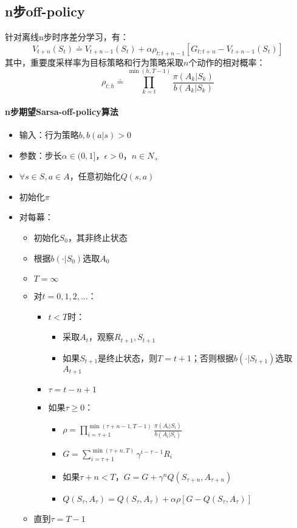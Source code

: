 \documentclass[
12pt, %
a4paper, 
oneside, %
headinclude,footinclude, %
]{scrartcl}
\begin{document}
\subsection{n步off-policy}
针对离线n步时序差分学习，有：
$$ V_{t + n}(S_t) \doteq V_{t + n - 1}(S_t) + \alpha \rho_{t:t + n - 1}[G_{t:t + n} - V_{t + n - 1}(S_t)] $$
其中，重要度采样率为目标策略和行为策略采取$ n $个动作的相对概率：
$$ \rho_{t:h} \doteq \prod_{k = t}^{\min(h, T - 1)} \frac{\pi(A_k|S_k)}{b(A_k|S_k)} $$
\paragraph{n步期望Sarsa-off-policy算法}
\begin{itemize}
\item 输入：行为策略$ b, b(a|s) > 0 $
\item 参数：步长$ \alpha \in (0,1] $，$ \epsilon > 0 $，$ n \in N_+ $
\item $ \forall s \in S, a \in A $，任意初始化$ Q(s, a) $
\item 初始化$ \pi $
\item 对每幕：
\begin{itemize}
\item 初始化$ S_0 $，其非终止状态
\item 根据$ b(\cdot|S_0) $选取$ A_0 $
\item $ T = \infty $
\item 对$ t = 0, 1, 2, \dots $：
\begin{itemize}
\item $ t < T $时：
\begin{itemize}
\item 采取$ A_t $，观察$ R_{t + 1}, S_{t + 1} $
\item 如果$ S_{t + 1} $是终止状态，则$ T = t + 1 $；否则根据$ b(\cdot|S_{t + 1}) $选取$ A_{t + 1} $
\end{itemize}
\item $ \tau = t - n + 1 $
\item 如果$ \tau \geq 0 $：
\begin{itemize}
\item $ \rho = \prod_{i = \tau + 1}^{\min(\tau + n - 1,T - 1)} \frac{\pi(A_i|S_i)}{b(A_i|S_i)} $
\item $ G = \sum_{i = \tau + 1}^{\min(\tau + n, T)} \gamma^{i - \tau - 1}R_i $
\item 如果$ \tau + n < T $，$ G = G + \gamma^n Q(S_{\tau + n}, A_{\tau + n}) $ 
\item $ Q(S_{\tau},A_{\tau}) = Q(S_{\tau},A_{\tau}) + \alpha \rho[G - Q(S_{\tau},A_{\tau})] $
\end{itemize}
\end{itemize}
\item 直到$ \tau = T - 1 $
\end{itemize}
\end{itemize}
\end{document}
